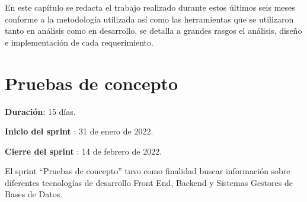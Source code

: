 En este capítulo se redacta el trabajo realizado durante estos últimos seis meses conforme a la metodología utilizada así como las herramientas que se utilizaron tanto en análisis como en desarrollo, se detalla a grandes rasgos el análisis, diseño e implementación de cada requerimiento.

\section{Pruebas de concepto}
    \begin{description}
        \item \textbf{Duración}: 15 días.
        \item \textbf{Inicio del sprint }: 31 de enero de 2022.
        \item \textbf{Cierre del sprint }: 14 de febrero de 2022.
    \end{description}

    El sprint ``Pruebas de concepto'' tuvo como finalidad buscar información sobre diferentes tecnologías de desarrollo Front End, Backend y Sistemas Gestores de Bases de Datos. 

